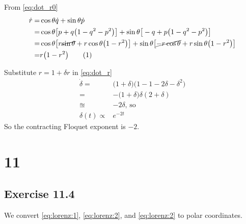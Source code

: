 \documentclass[]{article}
\newcommand\numberthis{\addtocounter{equation}{1}\tag{\theequation}}
\begin{document}
From \eqref{eq:dot_r0}
\begin{align*}
	\dot{r} =&	\cos{\theta} \dot{q} + \sin{\theta} \dot{p}\\
	=& 	\cos{\theta} \big[p + q\big(1-q^2-p^2\big)\big] + \sin{\theta} \big[-q + p\big(1-q^2-p^2\big)\big]\\
	=& 	\cos{\theta} \big[r \cancel{\sin{\theta}} + r \cos{\theta}\big(1-r^2\big)\big] + \sin{\theta} \big[\cancel{-r \cos{\theta}} + r \sin{\theta}\big(1-r^2\big)\big]\\
	=& r \big(1-r^2\big) \numberthis \label{eq:dot_r}
\end{align*}

Substitute $r=1+\delta r$ in \eqref{eq:dot_r}
\begin{align*}
	\dot{\delta} =& \big(1+\delta\big)\big(1 -1 -2 \delta - \delta^2\big)\\
	=& - \big(1+\delta\big) \delta (2 + \delta)\\
	\approxeq & - 2 \delta \text{, so}\\
	\delta(t) \propto & e^{-2 t}
\end{align*}
So the contracting Floquet exponent is $-2$.


\section{11}
\subsection{Exercise 11.4}
We convert  \eqref{eq:lorenz:1}, \eqref{eq:lorenz:2}, and  \eqref{eq:lorenz:2} to polar coordinates.
\end{document}
